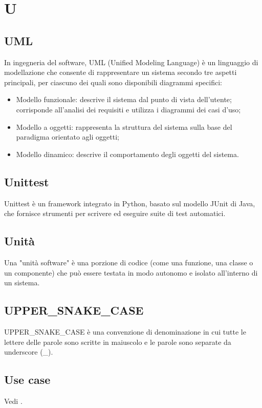 \section{U}

\vspace{2em}
\subsection*{UML}
\par In ingegneria del software, UML (Unified Modeling Language) è un linguaggio di modellazione che consente di rappresentare un sistema secondo tre aspetti principali, per ciascuno dei quali sono disponibili diagrammi specifici:
\begin{itemize}
  \item Modello funzionale: descrive il sistema dal punto di vista dell'utente; corrisponde all'analisi dei requisiti e utilizza i diagrammi dei casi d'uso;
  \item Modello a oggetti: rappresenta la struttura del sistema sulla base del paradigma orientato agli oggetti;
  \item Modello dinamico: descrive il comportamento degli oggetti del sistema.
\end{itemize}

\vspace{2em}
\subsection*{Unittest}
\par Unittest è un framework integrato in Python, basato sul modello JUnit di Java, che fornisce strumenti per scrivere ed eseguire suite di test automatici.

\vspace{2em}
\subsection*{Unità}
\par Una "unità software" è una porzione di codice (come una funzione, una classe o un componente) che può essere testata in modo autonomo e isolato all'interno di un sistema.

\vspace{2em}
\subsection*{UPPER\_SNAKE\_CASE}
\par UPPER\_SNAKE\_CASE è una convenzione di denominazione in cui tutte le lettere delle parole sono scritte in maiuscolo e le parole sono separate da underscore (\_).

\vspace{2em}
\subsection*{Use case}
\par Vedi .
